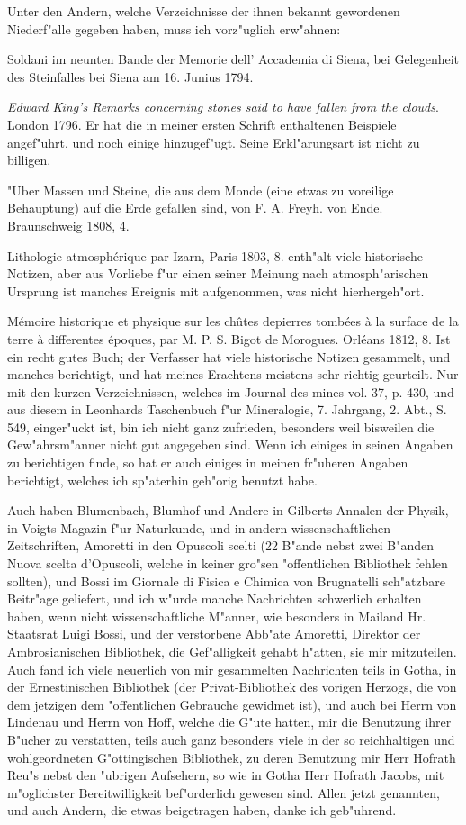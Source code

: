 \documentclass[a4paper, 11pt, oneside, polutonikogreek, german]{article}
\begin{document}
Unter den Andern, welche Verzeichnisse der ihnen bekannt gewordenen Niederf"alle gegeben haben, muss ich vorz"uglich erw"ahnen:

Soldani im neunten Bande der Memorie dell' Accademia di Siena, bei Gelegenheit des Steinfalles bei Siena am 16. Junius 1794.

\emph{Edward King's Remarks concerning stones said to have fallen from the clouds}. London 1796. Er hat die in meiner ersten Schrift enthaltenen Beispiele angef"uhrt, und noch einige hinzugef"ugt. Seine Erkl"arungsart ist nicht zu billigen.

"Uber Massen und Steine, die aus dem Monde (eine etwas zu voreilige Behauptung) auf die Erde gefallen sind, von F. A. Freyh. von Ende. Braunschweig 1808, 4.

Lithologie atmosphérique par Izarn, Paris 1803, 8. enth"alt viele historische Notizen, aber aus Vorliebe f"ur einen seiner Meinung nach atmosph"arischen Ursprung ist manches Ereignis mit aufgenommen, was nicht hierhergeh"ort.

Mémoire historique et physique sur les chûtes depierres tombées à la surface de la terre à differentes époques, par M. P. S. Bigot de Morogues. Orléans 1812, 8. Ist ein recht gutes Buch; der Verfasser hat viele historische Notizen gesammelt, und manches berichtigt, und hat meines Erachtens meistens sehr richtig geurteilt. Nur mit den kurzen Verzeichnissen, welches im Journal des mines vol. 37, p. 430, und aus diesem in Leonhards Taschenbuch f"ur Mineralogie, 7. Jahrgang, 2. Abt., S. 549, einger"uckt ist, bin ich nicht ganz zufrieden, besonders weil bisweilen die Gew"ahrsm"anner nicht gut angegeben sind. Wenn ich einiges in seinen Angaben zu berichtigen finde, so hat er auch einiges in meinen fr"uheren Angaben berichtigt, welches ich sp"aterhin geh"orig benutzt habe.

Auch haben Blumenbach, Blumhof und Andere in Gilberts Annalen der Physik, in Voigts Magazin f"ur Naturkunde, und in andern wissenschaftlichen Zeitschriften, Amoretti in den Opuscoli scelti (22 B"ande nebst zwei B"anden Nuova scelta d'Opuscoli, welche in keiner gro"sen "offentlichen Bibliothek fehlen sollten), und Bossi im Giornale di Fisica e Chimica von Brugnatelli sch"atzbare Beitr"age geliefert, und ich w"urde manche Nachrichten schwerlich erhalten haben, wenn nicht wissenschaftliche M"anner, wie besonders in Mailand Hr. Staatsrat Luigi Bossi, und der verstorbene Abb"ate Amoretti, Direktor der Ambrosianischen Bibliothek, die Gef"alligkeit gehabt h"atten, sie mir mitzuteilen. Auch fand ich viele neuerlich von mir gesammelten Nachrichten teils in Gotha, in der Ernestinischen Bibliothek (der Privat-Bibliothek des vorigen Herzogs, die von dem jetzigen dem "offentlichen Gebrauche gewidmet ist), und auch bei Herrn von Lindenau und Herrn von Hoff, welche die G"ute hatten, mir die Benutzung ihrer B"ucher zu verstatten, teils auch ganz besonders viele in der so reichhaltigen und wohlgeordneten G"ottingischen Bibliothek, zu deren Benutzung mir Herr Hofrath Reu"s nebst den "ubrigen Aufsehern, so wie in Gotha Herr Hofrath Jacobs, mit m"oglichster Bereitwilligkeit bef"orderlich gewesen sind. Allen jetzt genannten, und auch Andern, die etwas beigetragen haben, danke ich geb"uhrend.
\end{document}
